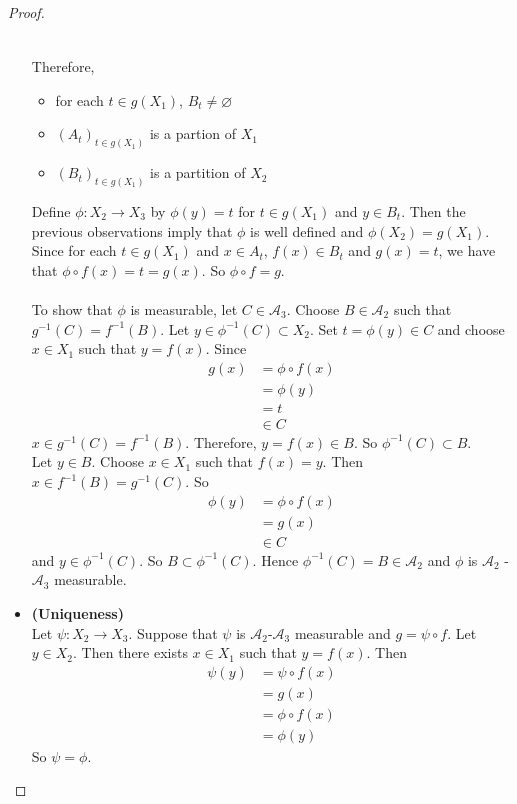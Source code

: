 \documentclass{book}
\theoremstyle{definition}
\newcommand{\MA}{\mathcal{A}}
\DeclareMathOperator*{\0}{\mbf{0}}
\DeclareMathOperator*{\1}{\mbf{1}}
\begin{document}
\begin{proof}
\begin{itemize}
\begin{itemize}
\begin{align*}
				\end{align*}
			\end{itemize}
			Therefore, 
			\begin{itemize}
				\item for each $t \in g(X_1)$, $B_t \neq \varnothing$
				\item $(A_t)_{t \in g(X_1)}$ is a partion of $X_1$
				\item $(B_t)_{t \in g(X_1)}$ is a partition of $X_2$\\
			\end{itemize}		
			Define $\phi:X_2 \rightarrow X_3$ by $\phi(y) = t$ for $t \in g(X_1)$ and $y \in B_t $. Then the previous observations imply that $\phi$ is well defined and $\phi(X_2) = g(X_1)$. Since for each $t \in g(X_1)$ and $x \in A_t$, $f(x) \in B_t$ and $g(x) = t$, we have that $\phi \circ f (x) = t = g(x)$. So $\phi \circ f = g$. \\ \\
			To show that $\phi$ is measurable, let $C \in \MA_3$. Choose $B \in \MA_2$ such that $g^{-1}(C) = f^{-1}(B)$.
			Let $y \in \phi^{-1}(C) \subset X_2$. Set $t = \phi(y) \in C$ and choose $x \in X_1$ such that $y = f(x)$. Since 
			\begin{align*}
				g(x) 
				&= \phi \circ f (x) \\
				&= \phi(y) \\
				&= t \\
				&\in C
			\end{align*}		
			$x \in g^{-1}(C) = f^{-1}(B)$. Therefore, $y = f(x) \in B$. So $\phi^{-1}(C) \subset B$. \\
			Let $y \in B$. Choose $x \in X_1$ such that $f(x) = y$. Then $x \in f^{-1}(B) = g^{-1}(C)$. So 
			\begin{align*}
				\phi(y) 
				&= \phi \circ f (x) \\
				&= g(x) \\
				&\in C
			\end{align*}	 
			and $y \in \phi^{-1}(C)$. So $B \subset \phi^{-1}(C)$. 
			Hence $\phi^{-1}(C) = B \in \MA_2$ and $\phi$ is $\MA_2$ - $\MA_3$ measurable.\\
			\item \textbf{(Uniqueness)} \\
			Let $\psi: X_2 \rightarrow X_3$. Suppose that $\psi$ is $\MA_2$-$\MA_3$ measurable and $g = \psi \circ f$. Let $y \in X_2$. Then there exists $x \in X_1$ such that $y = f(x)$. Then 
			\begin{align*}
				\psi(y) 
				&= \psi \circ f(x) \\
				&= g(x) \\
				&= \phi \circ f(x) \\
				&= \phi(y)
			\end{align*}
			So $\psi = \phi$.
		\end{itemize}
		
	\end{proof}
	
\end{document}
